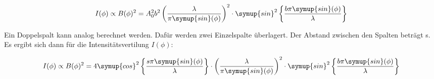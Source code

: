 \begin{equation}
  I(\phi) \propto B(\phi)^2 =
  A_0^2 b^2 \left( \frac{\lambda}{\pi \symup{sin}(\phi)} \right)^2
  \cdot \symup{sin}^2 \left\{ \frac{b \pi \symup{sin}(\phi)}{\lambda} \right\}
\end{equation}

Ein Doppelspalt kann analog berechnet werden.
Dafür werden zwei Einzelspalte überlagert.
Der Abstand zwischen den Spalten beträgt s.
Es ergibt sich dann für die Intensitätsvertilung $I(\phi)$:

\begin{equation}
  I(\phi) \propto B(\phi)^2 =
  4 \symup{cos}^2 \left\{ \frac{s \pi \symup{sin}(\phi)}{\lambda} \right\}
  \cdot \left( \frac{\lambda}{\pi \symup{sin}(\phi)} \right)^2
  \cdot \symup{sin}^2 \left\{ \frac{b \pi \symup{sin}(\phi)}{\lambda} \right\}
\end{equation}
